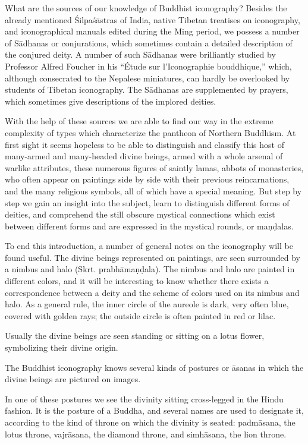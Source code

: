 \documentclass[a4paper, 12pt, oneside]{article}
\begin{document}
What are the sources of our knowledge of Buddhist iconography? Besides the already mentioned \'{S}ilpa\'{s}\={a}stras of India, native Tibetan treatises on iconography, and iconographical manuals edited during the Ming period, we possess a number of S\={a}dhanas or conjurations, which sometimes contain a detailed description of the conjured deity. A number of such S\={a}dhanas were brilliantly studied by Professor Alfred Foucher in his ``Étude sur l'Iconographie bouddhique,'' which, although consecrated to the Nepalese miniatures, can hardly be overlooked by students of Tibetan iconography. The S\={a}dhanas are supplemented by prayers, which sometimes give descriptions of the implored deities.

With the help of these sources we are able to find our way in the extreme complexity of types which characterize the pantheon of Northern Buddhism. At first sight it seems hopeless to be able to distinguish and classify this host of many-armed and many-headed divine beings, armed with a whole arsenal of warlike attributes, these numerous figures of saintly lamas, abbots of monasteries, who often appear on paintings side by side with their previous reincarnations, and the many religious symbols, all of which have a special meaning. But step by step we gain an insight into the subject, learn to distinguish different forms of deities, and comprehend the still obscure mystical connections which exist between different forms and are expressed in the mystical rounds, or ma\d{n}\d{d}alas.

To end this introduction, a number of general notes on the iconography will be found useful. The divine beings represented on paintings, are seen surrounded by a nimbus and halo (Skrt. prabh\={a}ma\d{n}\d{d}ala). The nimbus and halo are painted in different colors, and it will be interesting to know whether there exists a correspondence between a deity and the scheme of colors used on its nimbus and halo. As a general rule, the inner circle of the aureole is dark, very often blue, covered with golden rays; the outside circle is often painted in red or lilac.

Usually the divine beings are seen standing or sitting on a lotus flower, symbolizing their divine origin.

The Buddhist iconography knows several kinds of postures or \={a}sanas in which the divine beings are pictured on images.

In one of these postures we see the divinity sitting cross-legged in the Hindu fashion. It is the posture of a Buddha, and several names are used to designate it, according to the kind of throne on which the divinity is seated: padm\={a}sana, the lotus throne, vajr\={a}sana, the diamond throne, and simh\={a}sana, the lion throne.
\end{document}
